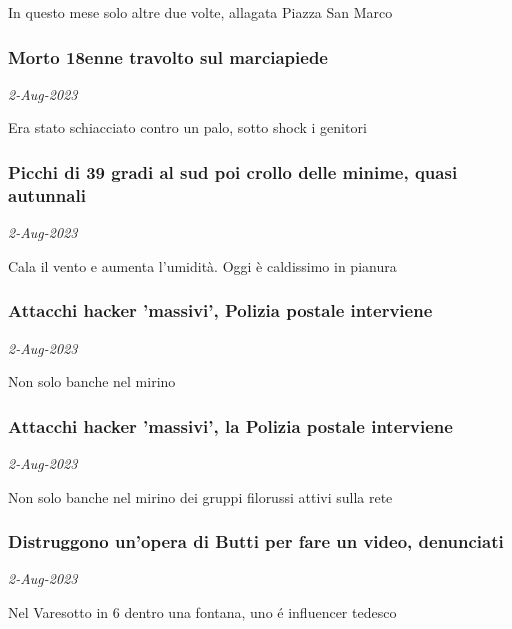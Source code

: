 In questo mese solo altre due volte, allagata Piazza San Marco
\subsubsection{Morto 18enne travolto sul marciapiede \href{https://www.ansa.it/sito/notizie/cronaca/2023/08/02/morto-18enne-travolto-sul-marciapiede_ca4f3c80-a1e6-4276-8b8e-2fee34968f9b.html}{}}
\textit{2-Aug-2023}

Era stato schiacciato contro un palo, sotto shock i genitori
\subsubsection{Picchi di 39 gradi al sud poi crollo delle minime, quasi autunnali \href{https://www.ansa.it/sito/notizie/cronaca/2023/08/02/picchi-di-39c-al-sud-poi-crollo-delle-minime-a-simil-autunnali_f9705661-4cae-446c-b280-5ff26c9195b1.html}{}}
\textit{2-Aug-2023}

Cala il vento e aumenta l'umidit\`{a}. Oggi \`{e} caldissimo in pianura
\subsubsection{Attacchi hacker 'massivi', Polizia postale interviene \href{https://www.ansa.it/sito/notizie/cronaca/2023/08/02/attacchi-hacker-massivi-polizia-postale-interviene_b3fcac4f-ab29-4cad-8914-177e9c4ab15d.html}{}}
\textit{2-Aug-2023}

Non solo banche nel mirino
\subsubsection{Attacchi hacker 'massivi', la Polizia postale interviene \href{https://www.ansa.it/sito/notizie/cronaca/2023/08/02/attacchi-hacker-massivi-polizia-postale-interviene_61b879af-3e56-453e-a8a2-b70f311dba51.html}{}}
\textit{2-Aug-2023}

Non solo banche nel mirino dei gruppi filorussi attivi sulla rete
\subsubsection{Distruggono un'opera di Butti per fare un video, denunciati \href{https://www.ansa.it/sito/notizie/cronaca/2023/08/02/distruggono-unopera-di-butti-per-fare-un-video-denunciati_f362e837-804d-4155-8d03-f586d6bdee31.html}{}}
\textit{2-Aug-2023}

Nel Varesotto in 6 dentro una fontana, uno é influencer tedesco
